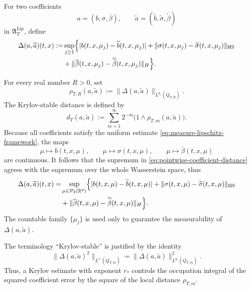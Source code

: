 \documentclass[12pt,oneside, reqno]{amsart}
\numberwithin{equation}{section}
\begin{document}
	
	For two coefficients
	\[
	a=(b,\sigma,\overline\beta), \qquad  \widetilde a=(\widetilde b,\widetilde\sigma,\overline{\widetilde\beta})
	\]
	in $\mathfrak A_T^{\mathrm{Lip}}$, define
	\begin{equation}
		\label{eq:pointwise-coefficient-distance}
		\begin{aligned}
			\Delta(a,\widetilde a)(t,x)
			:=&\sup_{j\geq 1}\Bigl\{|b(t,x,\mu_j)-\widetilde b(t,x,\mu_j)|+\|\sigma(t,x,\mu_j)
			-\widetilde\sigma(t,x,\mu_j)\|_{\mathrm{HS}}	\\
			&+	\|\overline\beta(t,x,\mu_j)	-\overline{\widetilde\beta}(t,x,\mu_j)\|_H\Bigr\}.
		\end{aligned}
	\end{equation}
	
	For every real number $R>0$, set
	\begin{equation}
		\label{eq:local-krylov-distance}
		\rho_{T,R}(a,\widetilde a)
		:=\|\Delta(a,\widetilde a)\|_{L^{q_\ast}(Q_{T,R})}.
	\end{equation}
	The Krylov-stable distance is defined by
	\begin{equation}
		\label{eq:krylov-stable-metric}
		d_T(a,\widetilde a)
		:=
		\sum_{m=1}^{\infty}
		2^{-m}
		\bigl(1\wedge\rho_{T,m}(a,\widetilde a)\bigr).
	\end{equation}
	Because all coefficients satisfy the uniform estimate \eqref{eq:measure-lipschitz-framework}, the maps
	\[
	\mu\longmapsto b(t,x,\mu),\qquad
	\mu\longmapsto \sigma(t,x,\mu),\qquad
	\mu\longmapsto\overline\beta(t,x,\mu)
	\]
	are continuous. It follows that the supremum in  \eqref{eq:pointwise-coefficient-distance} agrees with the supremum over the whole Wasserstein space, thus
	\begin{equation}
		\label{eq:dense-measure-supremum}
		\begin{aligned}
			\Delta(a,\widetilde a)(t,x)
			=&\sup_{\mu\in\mathcal P_2(\mathbb R^d)}\Bigl\{	|b(t,x,\mu)-\widetilde b(t,x,\mu)|
			+\|\sigma(t,x,\mu)-\widetilde\sigma(t,x,\mu)\|_{\mathrm{HS}}\\
			&+\|\overline\beta(t,x,\mu)-\overline{\widetilde\beta}(t,x,\mu)\|_H\Bigr\}.
		\end{aligned}
	\end{equation}
	The countable family $\{\mu_j\}$ is used only to guarantee the measurability of $\Delta(a,\widetilde a)$.
	
	The terminology ``Krylov-stable'' is justified by the identity
	\[
	\|\Delta(a,\widetilde a)^2\|_{L^{r_\ast}(Q_{T,m})}
	=\|\Delta(a,\widetilde a)\|_{L^{q_\ast}(Q_{T,m})}^2.
	\]
	Thus, a Krylov estimate with exponent $r_\ast$ controls the occupation integral of the squared coefficient error by the square of the local distance $\rho_{T,m}$.
	
\end{document}
